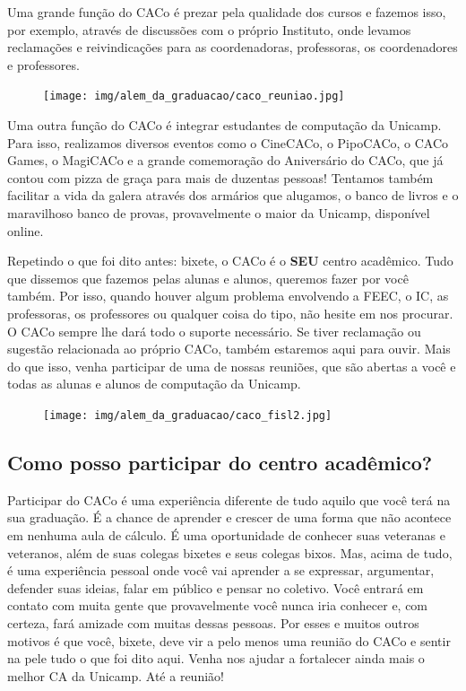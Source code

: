 Uma grande função do CACo é prezar pela qualidade dos cursos e fazemos isso,
por exemplo, através de discussões com o próprio Instituto, onde levamos
reclamações e reivindicações para as coordenadoras, professoras, os
coordenadores e professores.

\begin{figure}[H]
  \centering
  \texttt{[image: img/alem\_da\_graduacao/caco\_reuniao.jpg]}
\end{figure}

Uma outra função do CACo é integrar estudantes de computação da Unicamp. Para
isso, realizamos diversos eventos como o CineCACo, o PipoCACo, o CACo Games,
o MagiCACo e a grande comemoração do Aniversário do CACo, que já contou com
pizza de graça para mais de duzentas pessoas! Tentamos também facilitar a vida
da galera através dos armários que alugamos, o banco de livros e o maravilhoso
banco de provas, provavelmente o maior da Unicamp, disponível online.

Repetindo o que foi dito antes: bixete, o CACo é o \textbf{SEU} centro
acadêmico. Tudo que dissemos que fazemos pelas alunas e alunos, queremos fazer
por você também. Por isso, quando houver algum problema envolvendo a FEEC, o
IC, as professoras, os professores ou qualquer coisa do tipo, não hesite em nos
procurar. O CACo sempre lhe dará todo o suporte necessário. Se tiver reclamação
ou sugestão relacionada ao próprio CACo, também estaremos aqui para ouvir. Mais
do que isso, venha participar de uma de nossas reuniões, que são abertas a você
e todas as alunas e alunos de computação da Unicamp.

\begin{figure}[H]
  \centering
  \texttt{[image: img/alem\_da\_graduacao/caco\_fisl2.jpg]}
\end{figure}

\subsection{Como posso participar do centro acadêmico?}

Participar do CACo é uma experiência diferente de tudo aquilo que você terá na
sua graduação. É a chance de aprender e crescer de uma forma que não acontece
em nenhuma aula de cálculo. É uma oportunidade de conhecer suas veteranas e
veteranos, além de suas colegas bixetes e seus colegas bixos. Mas, acima de
tudo, é uma experiência pessoal onde você vai aprender a se expressar,
argumentar, defender suas ideias, falar em público e pensar no coletivo. Você
entrará em contato com muita gente que provavelmente você nunca iria conhecer
e, com certeza, fará amizade com muitas dessas pessoas. Por esses e muitos
outros motivos é que você, bixete, deve vir a pelo menos uma reunião do CACo e
sentir na pele tudo o que foi dito aqui. Venha nos ajudar a fortalecer ainda
mais o melhor CA da Unicamp. Até a reunião!

